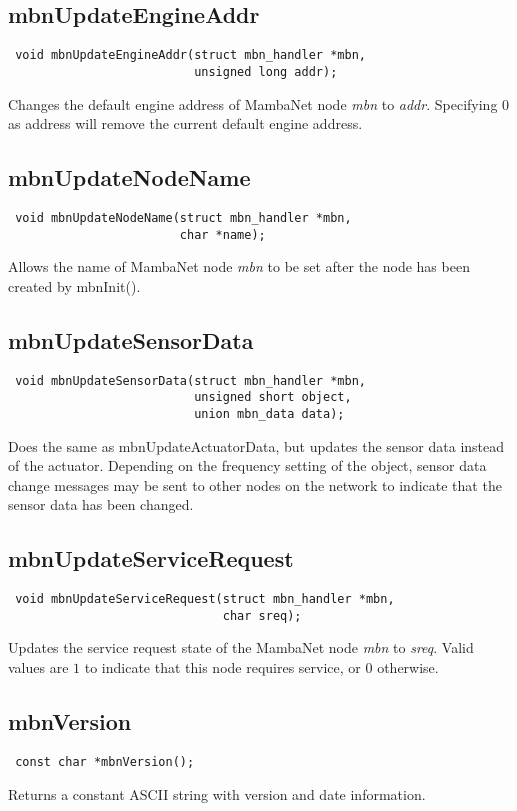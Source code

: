 \subsection{mbnUpdateEngineAddr}
\begin{verbatim}
 void mbnUpdateEngineAddr(struct mbn_handler *mbn,
                          unsigned long addr);
\end{verbatim}
Changes the default engine address of MambaNet node \textit{mbn} to \textit{addr}. Specifying $0$ as address will remove the current default engine address.


\subsection{mbnUpdateNodeName}
\begin{verbatim}
 void mbnUpdateNodeName(struct mbn_handler *mbn,
                        char *name);
\end{verbatim}
Allows the name of MambaNet node \textit{mbn} to be set after the node has been created by mbnInit().


\subsection{mbnUpdateSensorData}
\begin{verbatim}
 void mbnUpdateSensorData(struct mbn_handler *mbn,
                          unsigned short object,
                          union mbn_data data);
\end{verbatim}
Does the same as mbnUpdateActuatorData, but updates the sensor data instead of the actuator. Depending on the frequency setting of the object, sensor data change messages may be sent to other nodes on the network to indicate that the sensor data has been changed.


\subsection{mbnUpdateServiceRequest}
\begin{verbatim}
 void mbnUpdateServiceRequest(struct mbn_handler *mbn,
                              char sreq);
\end{verbatim}
Updates the service request state of the MambaNet node \textit{mbn} to \textit{sreq}. Valid values are $1$ to indicate that this node requires service, or $0$ otherwise.


\subsection{mbnVersion}
\begin{verbatim}
 const char *mbnVersion();
\end{verbatim}
Returns a constant ASCII string with version and date information.


